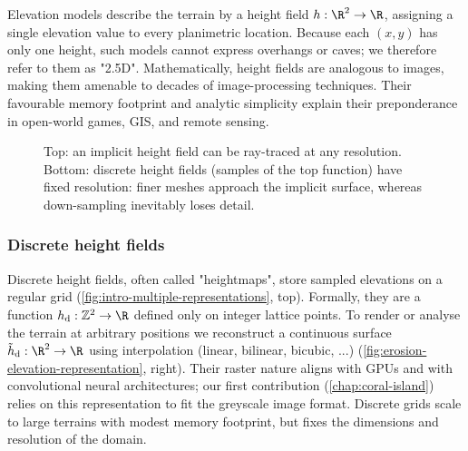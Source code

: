Elevation models describe the terrain by a height field $h: \R^{2}  \to  \R$, assigning a single elevation value to every planimetric location. Because each $(x,y)$ has only one height, such models cannot express overhangs or caves; we therefore refer to them as "2.5D". Mathematically, height fields are analogous to images, making them amenable to decades of image-processing techniques. Their favourable memory footprint and analytic simplicity explain their preponderance in open-world games, GIS, and remote sensing.

\begin{figure}
    \caption[Comparison of an implicit representation with discrete representations at different resolutions]{Top: an implicit height field can be ray-traced at any resolution. Bottom: discrete height fields (samples of the top
    function) have fixed resolution: finer meshes approach the implicit surface, whereas down-sampling inevitably loses detail.}
    \label{fig:sota-representations-heights-resolutions}
\end{figure}


\subsubsection{Discrete height fields}
Discrete height fields, often called "heightmaps", store sampled elevations on a regular grid (\cref{fig:intro-multiple-representations}, top). Formally, they are a function $h_{ \text{d}}: \mathbb{Z}^{2} \to \R$ defined only on integer lattice points. To render or analyse the terrain at arbitrary positions we reconstruct a continuous surface $ \tilde{h}_{ \text{d}}: \R^{2} \to \R$ using interpolation (linear, bilinear, bicubic, ...) (\cref{fig:erosion-elevation-representation}, right). Their raster nature aligns with GPUs and with convolutional neural architectures; our first contribution (\cref{chap:coral-island}) relies on this representation to fit the greyscale image format. Discrete grids scale to large terrains with modest memory footprint, but fixes the dimensions and resolution of the domain.

